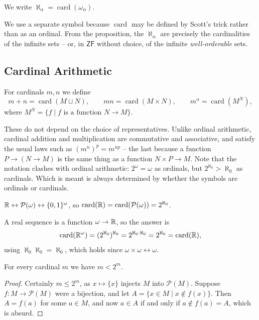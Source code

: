 \documentclass[a4paper]{scrartcl}
\newcommand{\card}{\operatorname{card}}
\newcommand{\ZF}{\mathsf{ZF}}
\begin{document}
\begin{definition}[Aleph]
  We write $\aleph_\alpha = \card(\omega_\alpha)$.
\end{definition}

We use a separate symbol because $\card$ may be defined by Scott's trick rather than as an ordinal. From the proposition, the $\aleph_\alpha$ are precisely the cardinalities of the infinite sets -- or, in $\ZF$ without choice, of the infinite \emph{well-orderable} sets.

\subsection{Cardinal Arithmetic}

\begin{definition}
  For cardinals $m, n$ we define
  $$m + n = \card(M \sqcup N), \qquad mn = \card(M \times N), \qquad m^n = \card(M^N),$$
  where $M^N = \{f \mid f \text{ is a function } N \to M\}$.
\end{definition}

These do not depend on the choice of representatives. Unlike ordinal arithmetic, cardinal addition and multiplication are commutative and associative, and satisfy the usual laws such as $(m^n)^p = m^{np}$ -- the last because a function $P \to (N \to M)$ is the same thing as a function $N \times P \to M$. Note that the notation clashes with ordinal arithmetic: $2^\omega = \omega$ as ordinals, but $2^{\aleph_0} > \aleph_0$ as cardinals. Which is meant is always determined by whether the symbols are ordinals or cardinals.

\begin{example}
  $\mathbb{R} \leftrightarrow \mathcal{P}(\omega) \leftrightarrow \{0,1\}^\omega$, so $\card(\R) = \card(\mathcal{P}(\omega)) = 2^{\aleph_0}$.
\end{example}

\begin{example}
  A real sequence is a function $\omega \to \mathbb{R}$, so the answer is
  $$\card(\R^\omega) = (2^{\aleph_0})^{\aleph_0} = 2^{\aleph_0 \cdot \aleph_0} = 2^{\aleph_0} = \card(\R),$$
  using $\aleph_0 \aleph_0 = \aleph_0$, which holds since $\omega \times \omega \leftrightarrow \omega$.
\end{example}

\begin{theorem}[Cantor]
  For every cardinal $m$ we have $m < 2^m$.
\end{theorem}
\begin{proof}
  Certainly $m \leq 2^m$, as $x \mapsto \{x\}$ injects $M$ into $\mathcal{P}(M)$. Suppose $f: M \to \mathcal{P}(M)$ were a bijection, and let $A = \{x \in M \mid x \notin f(x)\}$. Then $A = f(a)$ for some $a \in M$, and now $a \in A$ if and only if $a \notin f(a) = A$, which is absurd.
\end{proof}
\end{document}

